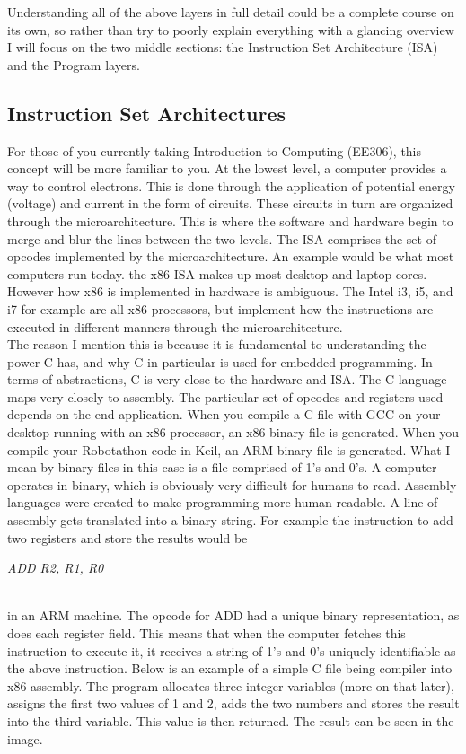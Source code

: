 \documentclass[paper=a4, fontsize=11pt]{scrartcl}
\numberwithin{equation}{section}		%
\numberwithin{figure}{section}			%
\numberwithin{table}{section}			%
\begin{document}
\newpage
Understanding all of the above layers in full detail could be a complete course on its own, so rather than try to poorly explain everything with a glancing overview I will focus on the two middle sections: the Instruction Set Architecture (ISA) and the Program layers.

\subsection{Instruction Set Architectures}
For those of you currently taking Introduction to Computing (EE306), this concept will be more familiar to you. At the lowest level, a computer provides a way to control electrons. This is done through the application of potential energy (voltage) and current in the form of circuits. These circuits in turn are organized through the microarchitecture. This is where the software and hardware begin to merge and blur the lines between the two levels. The ISA comprises the set of opcodes implemented by the microarchitecture. An example would be what most computers run today. the x86 ISA makes up most desktop and laptop cores. However how x86 is implemented in hardware is ambiguous. The Intel i3, i5, and i7 for example are all x86 processors, but implement how the instructions are executed in different manners through the microarchitecture. \\

The reason I mention this is because it is fundamental to understanding the power C has, and why C in particular is used for embedded programming. In terms of abstractions, C is very close to the hardware and ISA. The C language maps very closely to assembly. The particular set of opcodes and registers used depends on the end application. When you compile a C file with GCC on your desktop running with an x86 processor, an x86 binary file is generated. When you compile your Robotathon code in Keil, an ARM binary file is generated. What I mean by binary files in this case is a file comprised of 1's and 0's. A computer operates in binary, which is obviously very difficult for humans to read. Assembly languages were created to make programming more human readable. A line of assembly gets translated into a binary string. For example the instruction to add two registers and store the results would be \\
\centerline{\textit{ADD R2, R1, R0}} \\
in an ARM machine. The opcode for ADD had a unique binary representation, as does each register field. This means that when the computer fetches this instruction to execute it, it receives a string of 1's and 0's uniquely identifiable as the above instruction. Below is an example of a simple C file being compiler into x86 assembly. The program allocates three integer variables (more on that later), assigns the first two values of 1 and 2, adds the two numbers and stores the result into the third variable. This value is then returned. The result can be seen in the image.
\end{document}
